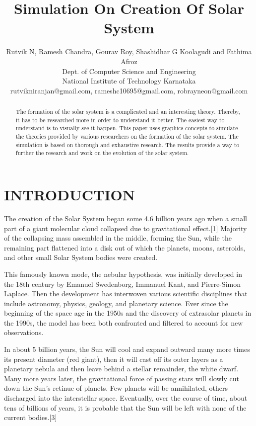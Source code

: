 \documentclass[letterpaper, 10 pt, conference]{ieeeconf}  %
\title{\LARGE \bf
Simulation On Creation Of Solar System
}
\author{Rutvik N, Ramesh Chandra, Gourav Roy, Shashidhar G Koolagudi and Fathima Afroz\\ Dept. of Computer Science and Engineering\\ National Institute of Technology Karnataka\\ rutvikniranjan@gmail.com, rameshc10695@gmail.com, robrayneon@gmail.com
}
\begin{document}
\maketitle
\thispagestyle{empty}
\pagestyle{empty}


\begin{abstract}
The formation of the solar system is a complicated and an interesting theory. Thereby, it has to be researched more in order to understand it better. The easiest way to understand is to visually see it happen. This paper uses graphics concepts to simulate the theories provided by various researchers on the formation of the solar system. The simulation is based on thorough and exhaustive research. The results provide a way to further the research and work on the evolution of the solar system.    

\end{abstract}


\section{INTRODUCTION}
The creation of the Solar System began some 4.6 billion years ago when a small part of a giant molecular cloud collapsed due to gravitational effect.[1] Majority of the collapsing mass assembled in the middle, forming the Sun, while the remaining part flattened into a disk out of which the planets, moons, asteroids, and other small Solar System bodies were created.

This famously known mode, the nebular hypothesis, was initially developed in the 18th century by Emanuel Swedenborg, Immanuel Kant, and Pierre-Simon Laplace. Then the development has interwoven various scientific disciplines that include astronomy, physics, geology, and planetary science. Ever since the beginning of the space age in the 1950s and the discovery of extrasolar planets in the 1990s, the model has been both confronted and filtered to account for new observations.

In about 5 billion years, the Sun will cool and expand outward many more times its present diameter (red giant), then it will cast off its outer layers as a planetary nebula and then leave behind a stellar remainder, the white dwarf. Many more years later, the gravitational force of passing stars will slowly cut down the Sun's retinue of planets. Few planets will be annihilated, others discharged into the interstellar space. Eventually, over the course of time, about tens of billions of years, it is probable that the Sun will be left with none of the current bodies.[3]
\end{document}
